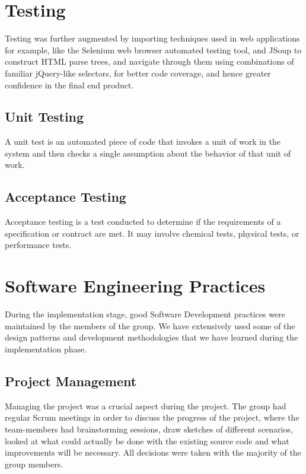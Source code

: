 \documentclass[11pt,twocolumn]{article} %
\begin{document}
\section{Testing}
Testing was further augmented by importing techniques used in web applications for example, like the Selenium web browser automated testing tool, and JSoup to construct
HTML parse trees, and navigate through them using combinations of familiar jQuery-like
selectors, for better code coverage, and hence greater confidence in the final end product.

\subsection{Unit Testing}
A unit test is an automated piece of code that invokes a unit of work in the system and then checks a single assumption about
the behavior of that unit of work.\cite{JUnit} 

\subsection{Acceptance Testing}
Acceptance testing is a test conducted to determine if the requirements of a specification or contract are met. 
It may involve chemical tests, physical tests, or performance tests.

\section{Software Engineering Practices}
During the implementation stage, good Software Development practices were maintained by the members of the group. We have extensively used some of the design patterns and development methodologies that we have learned during the implementation phase.

\subsection{Project Management}
Managing the project was a crucial aspect during the project. The group had regular Scrum meetings in order to discuss the 
progress of the project, where the team-members had brainstorming sessions, draw sketches of different scenarios, looked at
what could actually be done with the existing source code and what improvements will be necessary. All decisions were taken
with the majority of the group members.
\end{document}
